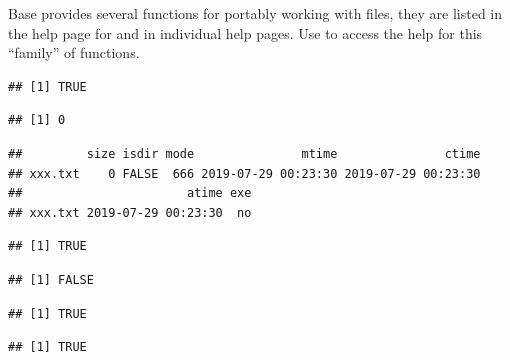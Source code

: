 \documentclass[krantz2]{krantz}\usepackage{knitr}%
\begin{document}
Base \Rlang provides several functions for portably working with files, they are listed in the help page for  and in individual help pages. Use  to access the help for this ``family'' of functions.

\begin{knitrout}\footnotesize
{}\color{fgcolor}\begin{kframe}
\begin{alltt}
 \hlstd{(}\hlopt{!}\hlstd{(}\hlstd{)) \{}
  \hlstd{(}\hlstd{)}
\hlstd{\}}
\end{alltt}
\begin{verbatim}
## [1] TRUE
\end{verbatim}
\begin{alltt}
\hlstd{(}\hlstd{)}
\end{alltt}
\begin{verbatim}
## [1] 0
\end{verbatim}
\begin{alltt}
\hlstd{(}\hlstd{)}
\end{alltt}
\begin{verbatim}
##         size isdir mode               mtime               ctime
## xxx.txt    0 FALSE  666 2019-07-29 00:23:30 2019-07-29 00:23:30
##                       atime exe
## xxx.txt 2019-07-29 00:23:30  no
\end{verbatim}
\begin{alltt}
\hlstd{(}\hlstd{,} \hlstd{)}
\end{alltt}
\begin{verbatim}
## [1] TRUE
\end{verbatim}
\begin{alltt}
\hlstd{(}\hlstd{)}
\end{alltt}
\begin{verbatim}
## [1] FALSE
\end{verbatim}
\begin{alltt}
\hlstd{(}\hlstd{)}
\end{alltt}
\begin{verbatim}
## [1] TRUE
\end{verbatim}
\begin{alltt}
\hlstd{(}\hlstd{)}
\end{alltt}
\begin{verbatim}
## [1] TRUE
\end{verbatim}
\end{kframe}
\end{knitrout}
\end{document}
